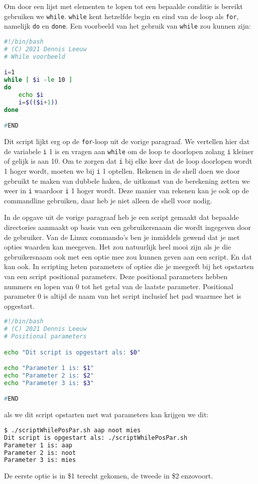Om door een lijst met elementen te lopen tot een bepaalde conditie is bereikt gebruiken we \texttt{while}. \texttt{while} kent hetzelfde begin en eind van de loop als \texttt{for}, namelijk \texttt{do} en \texttt{done}. Een voorbeeld van het gebruik van \texttt{while} zou kunnen zijn:
\begin{lstlisting}[language=bash]
#!/bin/bash
# (C) 2021 Dennis Leeuw
# While voorbeeld

i=1
while [ $i -le 10 ]
do
	echo $i
	i=$(($i+1))
done

#END
\end{lstlisting}
Dit script lijkt erg op de \texttt{for}-loop uit de vorige paragraaf. We vertellen hier dat de variabele \texttt{i} 1 is en vragen aan \texttt{while} om de loop te doorlopen zolang \texttt{i} kleiner of gelijk is aan 10. Om te zorgen dat \texttt{i} bij elke keer dat de loop doorlopen wordt 1 hoger wordt, moeten we bij \texttt{i} 1 optellen. Rekenen in de shell doen we door gebruikt te maken van dubbele haken, de uitkomst van de berekening zetten we weer in \texttt{i} waardoor \texttt{i} 1 hoger wordt. Deze manier van rekenen kan je ook op de commandline gebruiken, daar heb je niet alleen de shell voor nodig.

In de opgave uit de vorige paragraaf heb je een script gemaakt dat bepaalde directories aanmaakt op basis van een gebruikersnaam die wordt ingegeven door de gebruiker. Van de Linux commando's ben je inmiddels gewend dat je met opties waarden kan meegeven. Het zou natuurlijk heel mooi zijn als je die gebruikersnaam ook met een optie mee zou kunnen geven aan een script. En dat kan ook. In scripting heten parameters of opties die je meegeeft bij het opstarten van een script positional parameters. Deze positional parameters hebben nummers en lopen van 0 tot het getal van de laatste parameter. Positional parameter 0 is altijd de naam van het script inclusief het pad waarmee het is opgestart.
\begin{lstlisting}[language=bash]
#!/bin/bash
# (C) 2021 Dennis Leeuw
# Positional parameters

echo "Dit script is opgestart als: $0"

echo "Parameter 1 is: $1"
echo "Parameter 2 is: $2"
echo "Parameter 3 is: $3"

#END
\end{lstlisting}
als we dit script opstarten met wat parameters kan krijgen we dit:
\begin{lstlisting}[language=bash]
$ ./scriptWhilePosPar.sh aap noot mies
Dit script is opgestart als: ./scriptWhilePosPar.sh
Parameter 1 is: aap
Parameter 2 is: noot
Parameter 3 is: mies
\end{lstlisting}
De eerste optie is in \$1 terecht gekomen, de tweede in \$2 enzovoort.

